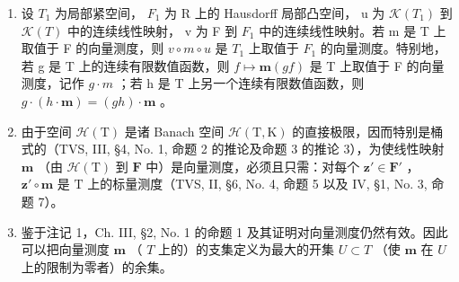 \begin{enumerate}
\def\labelenumi{\arabic{enumi})}
\setcounter{enumi}{1}
\item
  设 \(T_{1}\) 为局部紧空间， \(F_{1}\) 为 R 上的 Hausdorff 局部凸空间， u 为 \(\mathcal{K}(T_{1})\) 到 \(\mathcal{K}(T)\) 中的连续线性映射， v 为 F 到 \(F_{1}\) 中的连续线性映射。若 m 是 T 上取值于 F 的向量测度，则 \(v \circ m \circ u\) 是 \(T_{1}\) 上取值于 \(F_{1}\) 的向量测度。特别地，若 g 是 T 上的连续有限数值函数，则 \(f \mapsto \mathbf{m}(gf)\) 是 T 上取值于 F 的向量测度，记作 \(g \cdot m\) ；若 h 是 T 上另一个连续有限数值函数，则 \(g \cdot (h \cdot \mathbf{m}) = (gh) \cdot \mathbf{m}\) 。
\item
  由于空间 \(\mathcal{H}(\mathrm{T})\) 是诸 Banach 空间 \(\mathcal{H}(\mathrm{T},\mathrm{K})\) 的直接极限，因而特别是桶式的（TVS, III, §4, No. 1, 命题 2 的推论及命题 3 的推论 3），为使线性映射 \(\mathbf{m}\) （由 \(\mathcal{H}(\mathrm{T})\) 到 \(\mathbf{F}\) 中）是向量测度，必须且只需：对每个 \(\mathbf{z}' \in \mathbf{F}'\) ， \(\mathbf{z}' \circ \mathbf{m}\) 是 \(\mathrm{T}\) 上的标量测度（TVS, II, §6, No. 4, 命题 5 以及 IV, §1, No. 3, 命题 7）。
\item
  鉴于注记 1，Ch. III, §2, No. 1 的命题 1 及其证明对向量测度仍然有效。因此可以把向量测度 \(\mathbf{m}\) （ \(T\) 上的）的支集定义为最大的开集 \(U \subset T\) （使 \(\mathbf{m}\) 在 \(U\) 上的限制为零者）的余集。
\end{enumerate}

